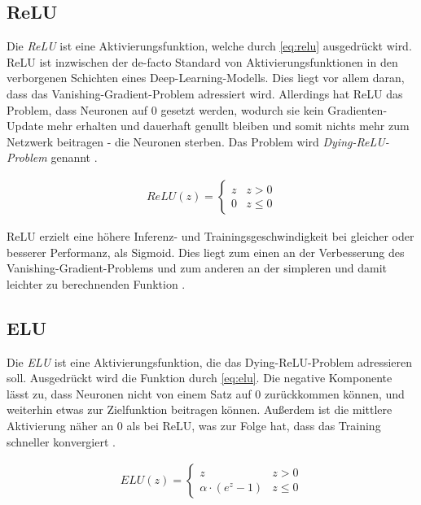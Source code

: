 \subsection{\acf{ReLU}}

Die \textit{\acf{ReLU}} ist eine Aktivierungsfunktion, welche durch \autoref{eq:relu} ausgedrückt wird. 
\ac{ReLU} ist inzwischen der de-facto Standard von Aktivierungsfunktionen in den verborgenen Schichten eines Deep-Learning-Modells.
Dies liegt vor allem daran, dass das Vanishing-Gradient-Problem adressiert wird. Allerdings hat \ac{ReLU} das Problem, 
dass Neuronen auf $0$ gesetzt werden, wodurch sie kein Gradienten-Update mehr erhalten und dauerhaft genullt bleiben 
und somit nichts mehr zum Netzwerk beitragen - die Neuronen sterben. Das Problem wird \textit{Dying-\ac{ReLU}-Problem} genannt \cite[S.~189--191]{Goodfellow.2016}. 

\begin{align}
	\label{eq:relu} ReLU(z) = \begin{cases} 
		z & z > 0 \\
		0 & z \leq 0 
	\end{cases}
\end{align} 

\ac{ReLU} erzielt eine höhere Inferenz- und Trainingsgeschwindigkeit bei gleicher oder besserer Performanz, 
als Sigmoid. Dies liegt zum einen an der Verbesserung des Vanishing-Gradient-Problems und zum anderen an der 
simpleren und damit leichter zu berechnenden Funktion \cite[S.~226]{Goodfellow.2016}.

\subsection{\acf{ELU}}

Die \textit{\acf{ELU}} ist eine Aktivierungsfunktion, die das Dying-\ac{ReLU}-Problem adressieren soll. 
Ausgedrückt wird die Funktion durch \autoref{eq:elu}. Die negative Komponente lässt zu, dass Neuronen nicht 
von einem Satz auf $0$ zurückkommen können, und weiterhin etwas zur Zielfunktion beitragen können. Außerdem ist die mittlere 
Aktivierung näher an $0$ als bei \ac{ReLU}, was zur Folge hat, dass das Training schneller konvergiert \cite{Clevert.23112015}.

\begin{align}
	\label{eq:elu} ELU(z) = \begin{cases} 
		z & z > 0 \\
		\alpha \cdot (e^z - 1) & z \leq 0 
	\end{cases}
\end{align}

